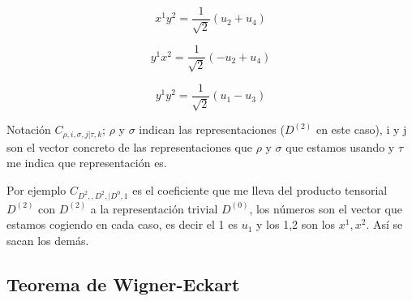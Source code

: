 $$x^1y^2=\frac{1}{\sqrt{2}}(u_2+u_4)$$

$$y^1x^2=\frac{1}{\sqrt{2}}(-u_2+u_4)$$

$$y^1y^2=\frac{1}{\sqrt{2}}(u_1-u_3)$$

Notación $C_{\rho, i, \sigma ,j | \tau , k}$; $\rho$ y $\sigma$ indican las representaciones ($D^{(2)}$ en este caso), i y j son el vector concreto de las representaciones que $\rho$ y $\sigma$ que estamos usando y $\tau$ me indica que representación es.

Por ejemplo $C_{D^2,,D^2, |D^0 ,1}$ es el coeficiente que me lleva del producto tensorial $D^{(2)}$ con $D^{(2)}$ a la representación trivial $D^{(0)}$, los números son el vector que estamos cogiendo en cada caso, es decir el 1 es $u_1$ y los 1,2 son los $x^1,x^2$. Así se sacan los demás.



\subsection{Teorema de Wigner-Eckart}

